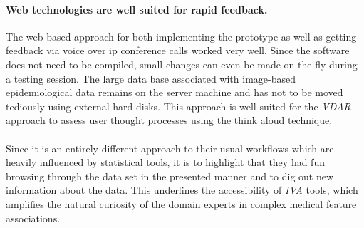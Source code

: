 \documentclass[journal]{style/vgtc} 			          %
\newcommand{\com}[1]{\textcolor{orange}{\uline{#1}}}
\begin{document}
\paragraph{Web technologies are well suited for rapid feedback.}
The web-based approach for both implementing the prototype as well as getting feedback via voice over ip conference calls worked very well.
%
Since the software does not need to be compiled, small changes can even be made on the fly during a testing session.
%
The large data base associated with image-based epidemiological data remains on the server machine and has not to be moved tediously using external hard disks.
%
This approach is well suited for the \emph{VDAR} approach to assess user thought processes using the think aloud technique.
\\\\
Since it is an entirely different approach to their usual workflows which are heavily influenced by statistical tools, it is to highlight that they had fun browsing through the data set in the presented manner and to dig out new information about the data.
%
This underlines the accessibility of \emph{IVA} tools, which amplifies the natural curiosity of the domain experts in complex medical feature associations.
%
\end{document}
